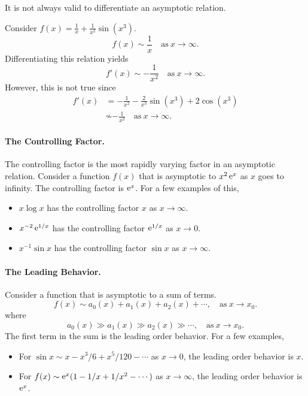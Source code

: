 It is not always valid to differentiate an asymptotic relation.  



\begin{Example}
  Consider $f(x) = \frac{1}{x} + \frac{1}{x^2} \sin(x^3)$.
  \[ f(x) \sim \frac{1}{x} \quad \mathrm{as}\ x \to \infty.\]
  Differentiating this relation yields
  \[f'(x) \sim -\frac{1}{x^2} \quad \mathrm{as}\ x \to \infty.\]
  However, this is not true since
  \begin{align*}
    f'(x)   &= -\frac{1}{x^2} - \frac{2}{x^3}\sin(x^3) + 2 \cos(x^3) \\
    &\not\sim -\frac{1}{x^2} \quad \mathrm{as}\ x \to \infty.
  \end{align*}
\end{Example}




\paragraph{The Controlling Factor.}
The controlling factor is the most rapidly varying factor in an asymptotic
relation.  Consider a function $f(x)$ that is asymptotic to $x^2 \mathop{\mathrm{e}}\nolimits^x$
as $x$ goes to infinity.  The controlling factor is $\mathop{\mathrm{e}}\nolimits^x$.  
For a few examples of this,
\begin{itemize}
\item $x \log x$ has the controlling factor $x$ as $x \to \infty$.
\item $x^{-2} \mathop{\mathrm{e}}\nolimits^{1/x}$ has the controlling factor $\mathop{\mathrm{e}}\nolimits^{1/x}$ as $x \to 0$.
\item $x^{-1} \sin x$ has the controlling factor $\sin x$ as $x \to \infty$.
\end{itemize}



\paragraph{The Leading Behavior.}
Consider a function that is asymptotic to a sum of terms.  
\[ f(x) \sim a_0(x) + a_1(x) + a_2(x) + \cdots, \quad \mathrm{as}\ x \to x_0.\]
where 
\[ a_0(x) \gg a_1(x) \gg a_2(x) \gg \cdots, \quad \mathrm{as}\ x \to x_0.\]
The first term in the sum is the leading order behavior.  For a few 
examples,
\begin{itemize}
\item For $\sin x \sim x - x^3/6 + x^5 / 120 - \cdots$ as $x \to 0$, the leading
  order behavior is $x$.
\item For $f(x) \sim \mathop{\mathrm{e}}\nolimits^x(1 - 1/x + 1/x^2 - \cdots)$ as $x \to \infty$, the leading
  order behavior is $\mathop{\mathrm{e}}\nolimits^x$.
\end{itemize}





